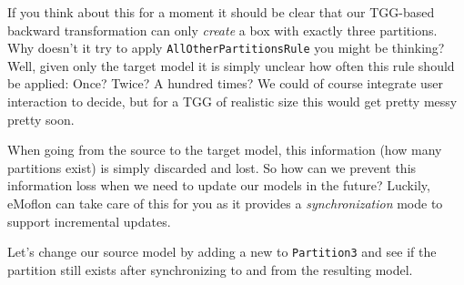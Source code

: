 If you think about this for a moment it should be clear that our TGG-based backward transformation can only \emph{create} a box with exactly three partitions.
Why doesn't it try to apply \texttt{AllOtherPartitionsRule} you might be thinking?
Well, given only the target model it is simply unclear how often this rule should be applied:  Once? Twice? A hundred times?
We could of course integrate user interaction to decide, but for a TGG of realistic size this would get pretty messy pretty soon. 

When going from the source to the target model, this information (how many partitions exist) is simply discarded and lost. 
So how can we prevent this information loss when we need to update our models in the future? Luckily, eMoflon can take care of this for you as it provides a \emph{synchronization} mode to support incremental updates.

Let's change our source model by adding a new  to \texttt{Partition3} and see if the partition still exists after synchronizing to and from the resulting  model.

